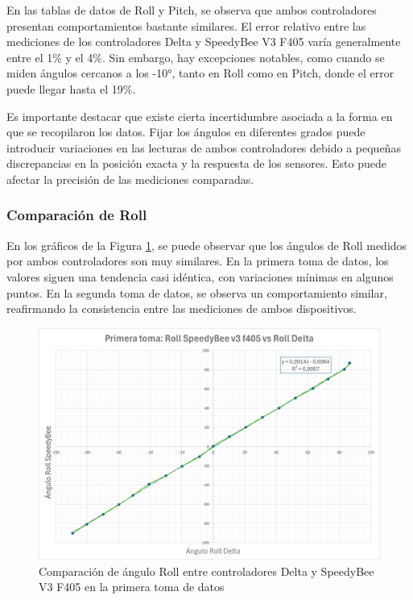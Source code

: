             En las tablas de datos de Roll y Pitch, se observa que ambos controladores presentan comportamientos bastante similares. El error relativo entre las mediciones de los controladores Delta y SpeedyBee V3 F405 varía generalmente entre el 1\% y el 4\%. Sin embargo, hay excepciones notables, como cuando se miden ángulos cercanos a los -10°, tanto en Roll como en Pitch, donde el error puede llegar hasta el 19\%.

            \vspace{5px}
            Es importante destacar que existe cierta incertidumbre asociada a la forma en que se recopilaron los datos. Fijar los ángulos en diferentes grados puede introducir variaciones en las lecturas de ambos controladores debido a pequeñas discrepancias en la posición exacta y la respuesta de los sensores. Esto puede afectar la precisión de las mediciones comparadas.
            \vspace{5px}

        \subsubsection{Comparación de Roll}
            En los gráficos de la Figura \ref{fig:comparacionRoll}, se puede observar que los ángulos de Roll medidos por ambos controladores son muy similares. En la primera toma de datos, los valores siguen una tendencia casi idéntica, con variaciones mínimas en algunos puntos. En la segunda toma de datos, se observa un comportamiento similar, reafirmando la consistencia entre las mediciones de ambos dispositivos.
            \begin{figure}[H]
                \centering
                \includegraphics[width=5.5 in]{Imagenes/Pruebas/roll_1_compare.png}
                \caption{Comparación de ángulo Roll entre controladores Delta y SpeedyBee V3 F405 en la primera toma de datos }
                \label{fig:comparacionRoll}
            \end{figure}


